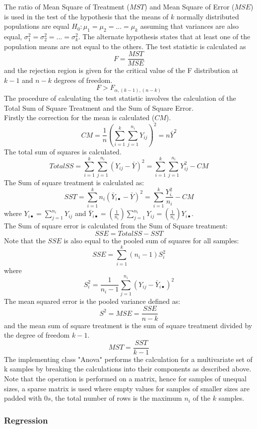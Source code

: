 \documentclass[a4paper]{article}
\begin{document}
The ratio of Mean Square of Treatment ($MST$) and Mean Square of Error ($MSE$) is used in the test of the hypothesis that the means of $k$ normally distributed populations are equal $H_0: \mu_1 = \mu_2 = ... = \mu_k$ assuming that variances are also equal, $\sigma_1^2 = \sigma_2^2 = ... = \sigma_k^2$. The alternate hypothesis states that at least one of the population means are not equal to the others. The test statistic is calculated as 
$$F = \frac{MST}{MSE}$$
and the rejection region is given for the critical value of the F distribution at $k-1$ and $n - k$ degrees of freedom.
$$
F > F_{\alpha,(k-1),(n-k)}
$$
The procedure of calculating the test statistic involves the calculation of the Total Sum of Square Treatment and the Sum of Square Error.\\
Firstly the correction for the mean is calculated ($CM$).
$$
CM = \frac{1}{n} \left( \sum_{i=1}^k \sum_{j=1}^{n_i} Y_{ij} \right)^2 = n\bar{Y}^2
$$
The total sum of squares is calculated.
$$
Total SS = \sum_{i=1}^k \sum_{j=1}^{n_i} (Y_{ij} - \bar{Y})^2 = \sum_{i=1}^k \sum_{j=1}^{n_i}  Y_{ij}^2 - CM
$$
The Sum of square treatment is calculated as:
$$
SST = \sum_{i=1}^k n_i (\bar{Y}_{i \bullet } - \bar{Y})^2 = \sum_{i=1}^k \frac{Y_{i .}^2}{n_i} - CM
$$
where $Y_{i \bullet } = \sum_{j=1}^{n_i} Y_{ij}$ and $\bar{Y}_{i \bullet } = \left( \frac{1}{n_i} \right) \sum_{j=1}^{n_i} Y_{ij} = \left( \frac{1}{n_i} \right) Y_{i \bullet }$.\\
The Sum of square error is calculated from the Sum of Square treatment:
$$
SSE = TotalSS - SST
$$
Note that the $SSE$ is also equal to the pooled sum of squares for all samples:
$$
SSE = \sum_{i=1}^k (n_i - 1)S_i^2
$$
where
$$
S_i^2 = \frac{1}{n_i - 1} \sum_{j=1}^{n_i} (Y_{ij} - \bar{Y}_{i\bullet}) ^ 2 
$$
The mean squared error is the pooled variance defined as:
$$
S^2 = MSE = \frac{SSE}{n - k}
$$
and the mean sum of square treatment is the sum of square treatment divided by the degree of freedom $k-1$.
$$
MST = \frac{SST}{k-1}
$$
The implementing class "Anova" performs the calculation for a multivariate set of k samples by breaking the calculations into their components as described above. Note that the operation is performed on a matrix, hence for samples of unequal sizes, a sparse matrix is used where empty values for samples of smaller sizes are padded with $0s$, the total number of rows is the maximum $n_i$ of the $k$ samples.

\subsubsection{Regression}
\end{document}
